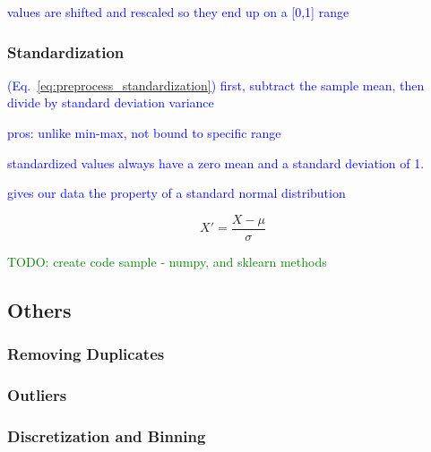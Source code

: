 \textcolor{blue}{values are shifted and rescaled so they end up on a [0,1] range}

\subsubsection{Standardization}

\textcolor{blue}{(Eq.~\ref{eq:preprocess_standardization}) first, subtract the sample mean, then divide by standard deviation variance}

\textcolor{blue}{pros: unlike min-max, not bound to specific range}

\textcolor{blue}{standardized values always have a zero mean and a standard deviation of 1.}

\textcolor{blue}{gives our data the property of a standard normal distribution}

\begin{equation}
{X' = \frac{X - \mu}{\sigma}}
\label{eq:preprocess_standardization}
\end{equation}

\textcolor{green}{TODO: create code sample - numpy, and sklearn methods}


\subsection{Others}

\subsubsection{Removing Duplicates}

\subsubsection{Outliers}

\subsubsection{Discretization and Binning}

